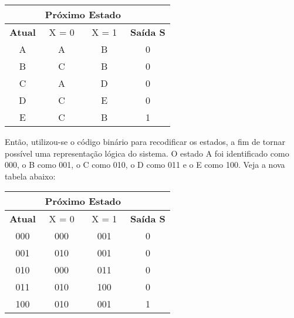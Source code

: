 \documentclass[12pt,a4paper]{article}
\begin{document}
\begin{table}[h]
\centering
\begin{tabular}{c|c|c|c}
\cline{2-3}
                                     & \multicolumn{2}{c|}{\textbf{Próximo Estado}} &                                     \\ \hline
\multicolumn{1}{|c|}{\textbf{Atual}} & X = 0                  & X = 1               & \multicolumn{1}{c|}{\textbf{Saída S}} \\ \hline
\multicolumn{1}{|c|}{A}              & A                      & B                   & \multicolumn{1}{c|}{0}              \\ \hline
\multicolumn{1}{|c|}{B}              & C                      & B                   & \multicolumn{1}{c|}{0}              \\ \hline
\multicolumn{1}{|c|}{C}              & A                      & D                   & \multicolumn{1}{c|}{0}              \\ \hline
\multicolumn{1}{|c|}{D}              & C                      & E                   & \multicolumn{1}{c|}{0}              \\ \hline
\multicolumn{1}{|c|}{E}              & C                      & B                   & \multicolumn{1}{c|}{1}              \\ \hline
\end{tabular}
\end{table}

Então, utilizou-se o código binário para recodificar os estados, a fim de tornar possível uma representação lógica do sistema. O estado A foi identificado como 000, o B como 001, o C como 010, o D como 011 e o E como 100. Veja a nova tabela abaixo:

\begin{table}[h]
\centering
\begin{tabular}{c|c|c|c}
\cline{2-3}
                                     & \multicolumn{2}{c|}{\textbf{Próximo Estado}} &                                     \\ \hline
\multicolumn{1}{|c|}{\textbf{Atual}} & X = 0                  & X = 1               & \multicolumn{1}{c|}{\textbf{Saída S}} \\ \hline
\multicolumn{1}{|c|}{000}            & 000                    & 001                 & \multicolumn{1}{c|}{0}              \\ \hline
\multicolumn{1}{|c|}{001}            & 010                    & 001                 & \multicolumn{1}{c|}{0}              \\ \hline
\multicolumn{1}{|c|}{010}            & 000                    & 011                 & \multicolumn{1}{c|}{0}              \\ \hline
\multicolumn{1}{|c|}{011}            & 010                    & 100                 & \multicolumn{1}{c|}{0}              \\ \hline
\multicolumn{1}{|c|}{100}            & 010                    & 001                 & \multicolumn{1}{c|}{1}              \\ \hline
\end{tabular}
\end{table}
\end{document}
